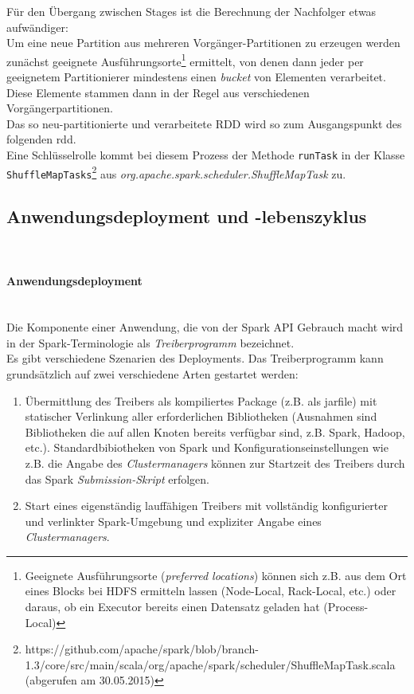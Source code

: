 Für den Übergang zwischen Stages ist die Berechnung der Nachfolger etwas aufwändiger:\\

Um eine neue Partition aus mehreren Vorgänger-Partitionen zu erzeugen werden zunächst geeignete Ausführungsorte\footnote{Geeignete Ausführungsorte (\textit{preferred locations}) können sich z.B. aus dem Ort eines Blocks bei HDFS ermitteln lassen (Node-Local, Rack-Local, etc.) oder daraus, ob ein Executor bereits einen Datensatz geladen hat (Process-Local)} ermittelt, von denen dann jeder per geeignetem Partitionierer mindestens einen \textit{bucket} von Elementen verarbeitet. Diese Elemente stammen dann in der Regel aus verschiedenen Vorgängerpartitionen.\\
Das so neu-partitionierte und verarbeitete \gls{RDD} wird so zum Ausgangspunkt des folgenden \gls{rdd}.\\
Eine Schlüsselrolle kommt bei diesem Prozess der Methode \lstinline|runTask| in der Klasse 
\lstinline|ShuffleMapTasks|\footnote{https://github.com/apache/spark/blob/branch-1.3/core/src/main/scala/org/apache/spark/scheduler/ShuffleMapTask.scala (abgerufen am 30.05.2015)} aus \textit{org.apache.spark.scheduler.ShuffleMapTask} zu.\\

\subsection{Anwendungsdeployment und -lebenszyklus}\\

\paragraph{Anwendungsdeployment}\\

Die Komponente einer Anwendung, die von der Spark API Gebrauch macht wird in der Spark-Terminologie als \textit{Treiberprogramm} bezeichnet. \\

Es gibt verschiedene Szenarien des Deployments. Das Treiberprogramm kann grundsätzlich auf zwei verschiedene Arten gestartet werden:\\

\begin{enumerate}
	\item Übermittlung des Treibers als kompiliertes Package (z.B. als \gls{jarfile}) mit statischer Verlinkung aller erforderlichen Bibliotheken (Ausnahmen sind Bibliotheken die auf allen Knoten bereits verfügbar sind, z.B. Spark, Hadoop, etc.). Standardbibiotheken von Spark und Konfigurationseinstellungen wie z.B. die Angabe des \textit{Clustermanagers} können zur Startzeit des Treibers durch das Spark \textit{Submission-Skript} erfolgen.
	\item Start eines eigenständig lauffähigen Treibers mit vollständig konfigurierter und verlinkter Spark-Umgebung und expliziter Angabe eines \textit{Clustermanagers}.
\end{enumerate}

